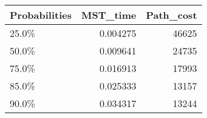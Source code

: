 \begin{tabular}{lrr}
\toprule
Probabilities &  MST\_time &  Path\_cost \\
\midrule
        25.0\% &  0.004275 &      46625 \\
        50.0\% &  0.009641 &      24735 \\
        75.0\% &  0.016913 &      17993 \\
        85.0\% &  0.025333 &      13157 \\
        90.0\% &  0.034317 &      13244 \\
\bottomrule
\end{tabular}
